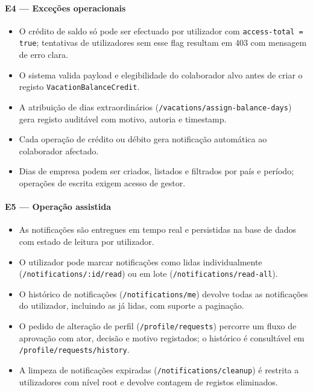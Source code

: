 \documentclass[11pt,a4paper,twoside]{article}
\begin{document}
\paragraph{E4 — Exceções operacionais}
\begin{itemize}
  \item O crédito de saldo só pode ser efectuado por utilizador com \texttt{access-total = true}; tentativas de utilizadores sem esse flag resultam em 403 com mensagem de erro clara.
  \item O sistema valida payload e elegibilidade do colaborador alvo antes de criar o registo \texttt{VacationBalanceCredit}.
  \item A atribuição de dias extraordinários (\texttt{/vacations/assign-balance-days}) gera registo auditável com motivo, autoria e timestamp.
  \item Cada operação de crédito ou débito gera notificação automática ao colaborador afectado.
  \item Dias de empresa podem ser criados, listados e filtrados por país e período; operações de escrita exigem acesso de gestor.
\end{itemize}

\paragraph{E5 — Operação assistida}
\begin{itemize}
  \item As notificações são entregues em tempo real e persistidas na base de dados com estado de leitura por utilizador.
  \item O utilizador pode marcar notificações como lidas individualmente (\texttt{/notifications/:id/read}) ou em lote (\texttt{/notifications/read-all}).
  \item O histórico de notificações (\texttt{/notifications/me}) devolve todas as notificações do utilizador, incluindo as já lidas, com suporte a paginação.
  \item O pedido de alteração de perfil (\texttt{/profile/requests}) percorre um fluxo de aprovação com ator, decisão e motivo registados; o histórico é consultável em \texttt{/profile/requests/history}.
  \item A limpeza de notificações expiradas (\texttt{/notifications/cleanup}) é restrita a utilizadores com nível root e devolve contagem de registos eliminados.
\end{itemize}
\end{document}
